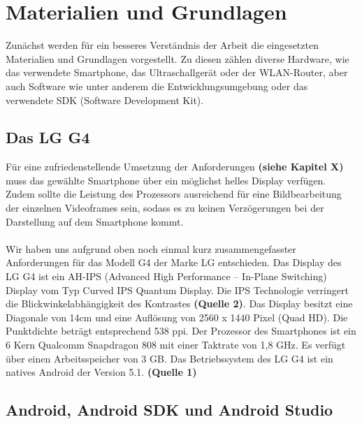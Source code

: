 \chapter{Materialien und Grundlagen}

Zunächst werden für ein besseres Verständnis der Arbeit die eingesetzten Materialien und Grundlagen vorgestellt. Zu diesen zählen diverse Hardware, wie das verwendete Smartphone, das Ultraschallgerät oder der WLAN-Router, aber auch Software wie unter anderem die Entwicklungsumgebung oder das verwendete SDK (Software Development Kit). 

\section{Das LG G4}

Für eine zufriedenstellende Umsetzung der Anforderungen \textbf{(siehe Kapitel X)} muss das gewählte Smartphone über ein möglichst helles Display verfügen. Zudem sollte die Leistung des Prozessors ausreichend für eine Bildbearbeitung der einzelnen Videoframes sein, sodass es zu keinen Verzögerungen bei der Darstellung auf dem Smartphone kommt.
\\ 
\\
Wir haben uns aufgrund oben noch einmal kurz zusammengefasster Anforderungen für das Modell G4 der Marke LG entschieden.  Das Display des LG G4 ist ein AH-IPS (Advanced High Performance – In-Plane Switching) Display vom Typ Curved IPS Quantum Display. Die IPS Technologie verringert die Blickwinkelabhängigkeit des Kontrastes \textbf{(Quelle 2)}. Das Display besitzt eine Diagonale von 14cm und eine Auflösung von 2560 x 1440 Pixel (Quad HD). Die Punktdichte beträgt entsprechend 538 ppi. Der Prozessor des Smartphones ist ein 6 Kern Qualcomm Snapdragon 808 mit einer Taktrate von 1,8 GHz. Es verfügt über einen Arbeitsspeicher von 3 GB. Das Betriebssystem des LG G4 ist ein natives Android der Version 5.1. \textbf{(Quelle 1)} 

\section{Android, Android SDK und Android Studio} \label{Android}


